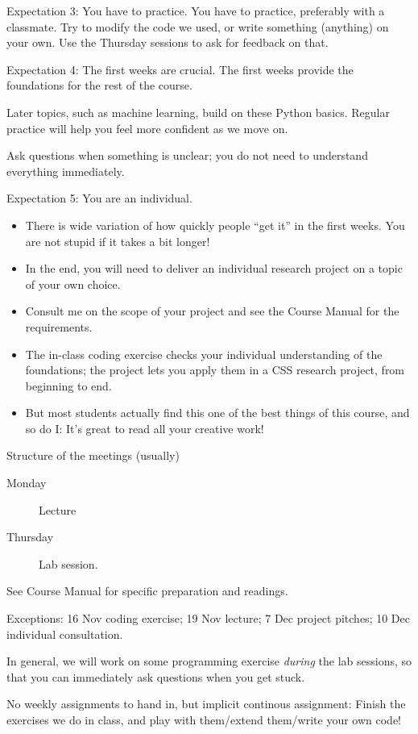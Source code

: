 \documentclass[compress]{beamer}
\begin{document}
\begin{frame}{Expectation 3: You have to practice.}
	You have to practice, preferably with a classmate. Try to modify the code we used, or write something (anything) on your own. Use the Thursday sessions to ask for feedback on that.
\end{frame}



\begin{frame}{Expectation 4: The first weeks are crucial.}
The first weeks provide the foundations for the rest of the course.

Later topics, such as machine learning, build on these Python basics. Regular practice will help you feel more confident as we move on.

Ask questions when something is unclear; you do not need to understand everything immediately.
\end{frame}


\begin{frame}{Expectation 5: You are an individual.}
\begin{itemize}
	\item There is wide variation of how quickly people ``get it'' in the first weeks. You are not stupid if it takes a bit longer!
	\item In the end, you will need to deliver an individual research project on a topic of your own choice.
	\item Consult me on the scope of your project and see the Course Manual for the requirements.
	\item The in-class coding exercise checks your individual understanding of the foundations; the project lets you apply them in a CSS research project, from beginning to end.
	\item But most students actually find this one of the best things of this course, and so do I: It's great to read all your creative work!
\end{itemize}

\end{frame}


\begin{frame}{Structure of the meetings (usually)}
	\begin{description}
		\item[Monday] Lecture
		\item[Thursday]Lab session.
	\end{description}
See Course Manual for specific preparation and readings.

Exceptions: 16 Nov coding exercise; 19 Nov lecture; 7 Dec project pitches; 10 Dec individual consultation.

In general, we will work on some programming exercise \emph{during} the lab sessions, so that you can immediately ask questions when you get stuck.

No weekly assignments to hand in, but implicit continous assignment: Finish the exercises we do in class, and play with them/extend them/write your own code!
\end{frame}
\end{document}
